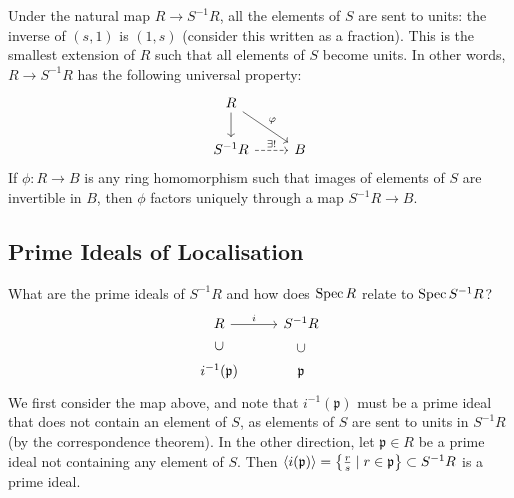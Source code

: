     Under the natural map \(R \to S^{-1}R\), all the elements of $S$ are sent to units: the inverse of $(s,1)$ is $(1,s)$ (consider this written as a fraction).
    This is the smallest extension of $R$ such that all elements of $S$ become units.
    In other words, \(R \to S^{-1}R\) has the following universal property:
    \begin{equation*}
        \begin{tikzcd}
            R\ar[d]\ar[dr,"\varphi"]& \\
            S^{-1}R\ar[r,dashed,"\exists!"]&B
        \end{tikzcd}
    \end{equation*}
   If \(\phi \colon R \to B\) is any ring homomorphism such that images of elements of $S$ are invertible in $B$, then \(\phi\) factors uniquely through a map \(S^{-1}R \to B\).

    \subsection{Prime Ideals of Localisation}
        What are the prime ideals of $S^{-1}R$ and how does $\operatorname{Spec}{R}$ relate to $\operatorname{Spec}{S^{-1}R}$?
        \begin{equation*}
            \begin{tikzcd}
                R\ar[r,"i"]&S^{-1}R\\
                i^{-1}(\mathfrak{p})\ar[u, phantom, sloped, "\subset"]&\mathfrak{p}\ar[u, phantom, sloped, "\subset"]
            \end{tikzcd}
        \end{equation*}
        We first consider the map above, and note that $i^{-1}(\mathfrak{p})$ must be a prime ideal that does not contain an element of $S$, as elements of $S$ are sent to units in $S^{-1}R$ (by the correspondence theorem).
        In the other direction, let $\mathfrak{p}\in R$ be a prime ideal not containing any element of \(S\).
        Then $\langle i(\mathfrak{p})\rangle=\left\{\frac{r}{s}\mid r\in\mathfrak{p}\right\} \subset S^{-1}R$ is a prime ideal.
        
